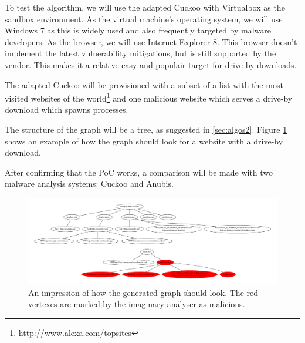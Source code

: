 To test the algorithm, we will use the adapted Cuckoo with Virtualbox as the sandbox environment. As the virtual machine's operating system, we will use Windows 7 as this is widely used and also frequently targeted by malware developers. As the browser, we will use Internet Explorer 8. This browser doesn't implement the latest vulnerability mitigations, but is still supported by the vendor. This makes it a relative easy and populair target for drive-by downloads.

The adapted Cuckoo will be provisioned with a subset of a list with the most visited websites of the world\footnote{http://www.alexa.com/topsites} and one malicious website which serves a drive-by download which spawns processes.

The structure of the graph will be a tree, as suggested in \ref{sec:algos2}. Figure \ref{fig:alg_tree} shows an example of how the graph should look for a website with a drive-by download.

After confirming that the PoC works, a comparison will be made with two malware analysis systems: Cuckoo and Anubis.

\pagebreak

\begin{figure}[h]
    \centering
    \centerline{\includegraphics[width=25cm,angle=90]{Images/alg_tree}}
    \caption{An impression of how the generated graph should look. The red vertexes are marked by the imaginary analyser as malicious.}
    \label{fig:alg_tree}
\end{figure}

\pagebreak

\restoregeometry
{}
\setcounter{page}{\thesavepage}
